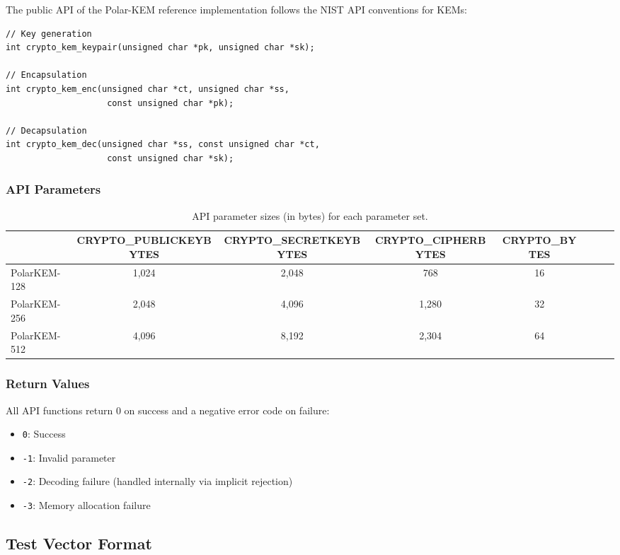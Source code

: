 \documentclass[11pt,a4paper]{article}
\newcommand{\polarKem}{\textsf{Polar-KEM}\xspace}
\newcommand{\NIST}{\textsf{NIST}\xspace}
\begin{document}
The public API of the \polarKem reference implementation follows the \NIST API conventions for KEMs:

\begin{verbatim}
// Key generation
int crypto_kem_keypair(unsigned char *pk, unsigned char *sk);

// Encapsulation
int crypto_kem_enc(unsigned char *ct, unsigned char *ss,
                    const unsigned char *pk);

// Decapsulation
int crypto_kem_dec(unsigned char *ss, const unsigned char *ct,
                    const unsigned char *sk);
\end{verbatim}

\subsubsection{API Parameters}

\begin{table}[H]
\centering
\caption{API parameter sizes (in bytes) for each parameter set.}
\label{tab:api-params}
\begin{tabular}{@{}lccccccc@{}}
\toprule
 & \textbf{CRYPTO\_PUBLICKEYBYTES} & \textbf{CRYPTO\_SECRETKEYBYTES} & \textbf{CRYPTO\_CIPHERBYTES} & \textbf{CRYPTO\_BYTES} \\
\midrule
PolarKEM-128 & 1,024 & 2,048 & 768 & 16 \\
PolarKEM-256 & 2,048 & 4,096 & 1,280 & 32 \\
PolarKEM-512 & 4,096 & 8,192 & 2,304 & 64 \\
\bottomrule
\end{tabular}
\end{table}

\subsubsection{Return Values}

All API functions return 0 on success and a negative error code on failure:
\begin{itemize}[leftmargin=2em]
\item \texttt{0}: Success
\item \texttt{-1}: Invalid parameter
\item \texttt{-2}: Decoding failure (handled internally via implicit rejection)
\item \texttt{-3}: Memory allocation failure
\end{itemize}

\subsection{Test Vector Format}\label{sec:test-vectors}
\end{document}
